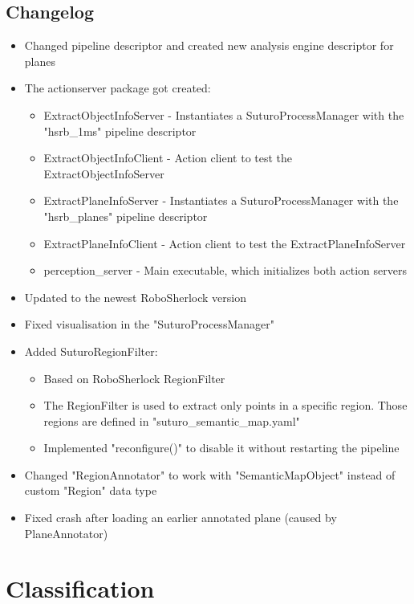 \documentclass[main.tex]{subfiles}
\begin{document}
			\subsection{Changelog}
			\begin{itemize}
			\item Changed pipeline descriptor and created new analysis engine descriptor for planes
			\item The actionserver package got created:
				\begin{itemize}
				\item ExtractObjectInfoServer - Instantiates a SuturoProcessManager with the "hsrb\_1ms" pipeline descriptor
				\item ExtractObjectInfoClient - Action client to test the ExtractObjectInfoServer
				\item ExtractPlaneInfoServer - Instantiates a SuturoProcessManager with the "hsrb\_planes" pipeline descriptor
				\item ExtractPlaneInfoClient - Action client to test the ExtractPlaneInfoServer
				\item perception\_server - Main executable, which initializes both action servers
				\end{itemize}
			\item Updated to the newest RoboSherlock version
			\item Fixed visualisation in the "SuturoProcessManager"
			\item Added SuturoRegionFilter:
				\begin{itemize}
				\item Based on RoboSherlock RegionFilter
				\item The RegionFilter is used to extract only points in a specific region. Those regions are defined in "suturo\_semantic\_map.yaml"
				\item Implemented "reconfigure()" to disable it without restarting the pipeline
				\end{itemize}
			\item Changed "RegionAnnotator" to work with "SemanticMapObject" instead of custom "Region" data type
			\item Fixed crash after loading an earlier annotated plane (caused by PlaneAnnotator)
			\end{itemize}

		\section{Classification}
		
\end{document}
